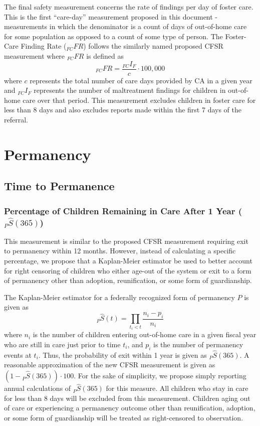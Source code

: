 \documentclass[12pt]{article}\usepackage[]{graphicx}\usepackage[]{color}
\begin{document}
The final safety measurement concerns the rate of findings per day of foster care. This is the first ``care-day'' measurement proposed in this document - measurements in which the denominator is a count of days of out-of-home care for some population as opposed to a count of some type of person. 
The Foster-Care Finding Rate (${}_{FC}FR$) follows the similarly named proposed CFSR measurement where ${}_{FC}FR$ is defined as 
\begin{equation}\label{eq:_FCFR}
{}_{FC}FR = \frac{{}_{FC}I_F}{c} \cdot 100,000
\end{equation}
where $c$ represents the total number of care days provided by CA in a given year and ${}_{FC}I_F$ represents the number of maltreatment findings for children in out-of-home care over that period. This measurement excludes children in foster care for less than 8 days and also excludes reports made within the first 7 days of the referral. 

\section{Permanency}

\subsection{Time to Permanence}

\subsubsection{Percentage of Children Remaining in Care After 1 Year (${}_{P}\hat{S}(365)$)}

This measurement is similar to the proposed CFSR measurement requiring exit to permanency within 12 months. However, instead of calculating a specific percentage, we propose that a Kaplan-Meier estimator be used to better account for right censoring of children who either age-out of the system or exit to a form of permanency other than adoption, reunification, or some form of guardianship. 
 
The Kaplan-Meier estimator for a federally recognized form of permanency $P$ is given as
\begin{equation}\label{eq:KM1}
{}_P\hat S(t) = \prod\limits_{t_i<t} \frac{n_i-p_{i}}{n_i}
\end{equation}
where $n_{i}$ is the number of children entering out-of-home care in a given fiscal year who are still in care just prior to time $t_{i}$, and $p_{i}$ is the number of permanency events at $t_{i}$. Thus, the probability of exit within 1 year is given as ${}_P\hat S(365)$. A reasonable approximation of the new CFSR measurement is given as $(1 - {}_P\hat S(365)) \cdot 100$. For the sake of simplicity, we propose simply reporting annual calculations of ${}_{P}\hat{S}(365)$ for this measure. All children who stay in care for less than 8 days will be excluded from this measurement. Children aging out of care or experiencing a permanency outcome other than reunification, adoption, or some form of guardianship will be treated as right-censored to observation. 
\end{document}
